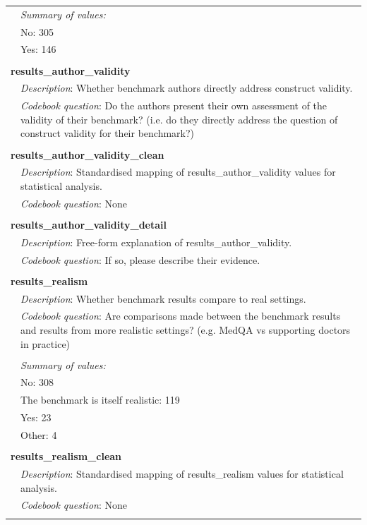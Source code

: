 {\begin{longtable}{p{}p{}}
\\
& \textit{Summary of values:} \\
& No: 305 \\
& Yes: 146 \\
\\
\multicolumn{2}{l}{\textbf{results\_author\_validity}} \\
& \textit{Description}: Whether benchmark authors directly address construct validity. \\
& \textit{Codebook question}: Do the authors present their own assessment of the validity of their benchmark? (i.e. do they directly address the question of construct validity for their benchmark?) \\
\\
\multicolumn{2}{l}{\textbf{results\_author\_validity\_clean}} \\
& \textit{Description}: Standardised mapping of results\_author\_validity values for statistical analysis. \\
& \textit{Codebook question}: None \\
\\
\multicolumn{2}{l}{\textbf{results\_author\_validity\_detail}} \\
& \textit{Description}: Free-form explanation of results\_author\_validity. \\
& \textit{Codebook question}: If so, please describe their evidence. \\
\\
\multicolumn{2}{l}{\textbf{results\_realism}} \\
& \textit{Description}: Whether benchmark results compare to real settings. \\
& \textit{Codebook question}: Are comparisons made between the benchmark results and results from more realistic settings? (e.g. MedQA vs supporting doctors in practice) \\
\\
& \textit{Summary of values:} \\
& No: 308 \\
& The benchmark is itself realistic: 119 \\
& Yes: 23 \\
& Other: 4 \\
\\
\multicolumn{2}{l}{\textbf{results\_realism\_clean}} \\
& \textit{Description}: Standardised mapping of results\_realism values for statistical analysis. \\
& \textit{Codebook question}: None \\
\\
\end{longtable}}

